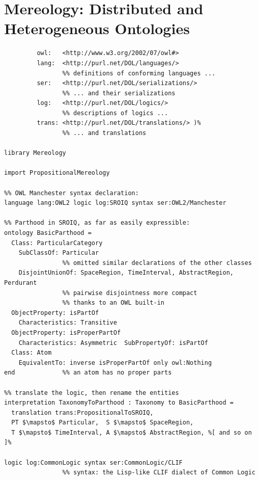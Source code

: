 \documentclass[10pt,fleqn,final]{scrreprt}
\newcommand{\sclause}[1]{\section{#1}}
\begin{document}
\sclause{Mereology: Distributed and Heterogeneous Ontologies}
\label{dist-het-onto}
\begin{lstlisting}[basicstyle=\ttfamily,language=dolText,morekeywords={props,ObjectProperty,Class,DisjointUnionOf,SubClassOf,Characteristics,Transitive,Asymmetric,SubPropertyOf,DisjointClasses,EquivalentTo,inverse,only,forall,iff,if,or,exists,import},escapechar=@,mathescape]
%prefix( :      <http://www.example.org/mereology#>
         owl:   <http://www.w3.org/2002/07/owl#>
         lang:  <http://purl.net/DOL/languages/>
                %% definitions of conforming languages ...
         ser:   <http://purl.net/DOL/serializations/>
                %% ... and their serializations
         log:   <http://purl.net/DOL/logics/>
                %% descriptions of logics ...
         trans: <http://purl.net/DOL/translations/> )%
                %% ... and translations

library Mereology

import PropositionalMereology

%% OWL Manchester syntax declaration: 
language lang:OWL2 logic log:SROIQ syntax ser:OWL2/Manchester           

%% Parthood in SROIQ, as far as easily expressible:
ontology BasicParthood =                             
  Class: ParticularCategory 
  	SubClassOf: Particular
                %% omitted similar declarations of the other classes
    DisjointUnionOf: SpaceRegion, TimeInterval, AbstractRegion, Perdurant
                %% pairwise disjointness more compact 
                %% thanks to an OWL built-in
  ObjectProperty: isPartOf        
  	Characteristics: Transitive
  ObjectProperty: isProperPartOf  
  	Characteristics: Asymmetric  SubPropertyOf: isPartOf 
  Class: Atom 
  	EquivalentTo: inverse isProperPartOf only owl:Nothing
end             %% an atom has no proper parts

%% translate the logic, then rename the entities
interpretation TaxonomyToParthood : Taxonomy to BasicParthood =
  translation trans:PropositionalToSROIQ,
  PT $\mapsto$ Particular,	S $\mapsto$ SpaceRegion, 
  T $\mapsto$ TimeInterval,	A $\mapsto$ AbstractRegion, %[ and so on ]%

logic log:CommonLogic syntax ser:CommonLogic/CLIF
                %% syntax: the Lisp-like CLIF dialect of Common Logic


\end{lstlisting}
\end{document}
